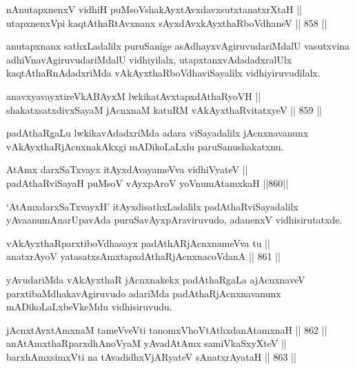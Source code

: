\begin{shl}
nAnutapxnenxV vidhiH puMsoV\s shakAyxtAvxdavxsutxtanatxrXtaH || \\
utapxnenxV\s pi kaqtAthaRtAvxnanx sAyxdAvxkAyxthaRboVdhaneV \hfill || 858 ||  
\end{shl}

\begin{artha}
anutapxnanx sathxLadalilx puruSanige asAdhayxvAgiruvudariMdalU vasutxvina adhiVnavAgiruvudariMdalU vidhiyilalx, utapxtanxvAdadadxralUlx kaqtAthaRnAdadxriMda vAkAyxthaRboVdhaviSayalilx vidhiyiruvudilalx.
\end{artha}

\begin{shl}
anavxyavayxtireVkABAyxM lwkikatAvxtapxdAthaRyoVH || \\
shakatxsatxdivxSayaM jAcnxnaM katuRM vAkAyxthaRvitatxyeV \hfill || 859 ||  
\end{shl}

\begin{artha}
padAthaRgaLu lwkikavAdadxriMda adara viSayadalilx jAcnxnavanunx vAkAyxthaRjAcnxnakAkxgi mADikoLaLxlu paruSanushakatxnu.
\end{artha}

\begin{shl}
AtAmx darxSaTxvayx itAyxdAvayameVva vidhiVyateV || \\
padAthaRviSayaH puMsoV vAyxpAroV yoV\s numAtamxkaH \hfill ||860||  
\end{shl}

\begin{artha}
`AtAmxdarxSaTxvayxH' itAyxdisathxLadalilx padAthaRviSayadalilx yAva\break anumAnarUpavAda puruSavAyxpAraviruvudo, adanenxV vidhisirutatxde.
\end{artha}

\begin{shl}
vAkAyxthaRparxtiboVdhasayx padAthARjAcnxnameVva tu || \\
anatxrAyoV yatasatxsAmxtapxdAthaRjAcnxnacoVdanA \hfill || 861 ||  
\end{shl}

\begin{artha}
yAvudariMda vAkAyxthaR jAcnxnakekx padAthaRgaLa ajAcnxnaveV parxtibaMdhakavAgiruvudo adariMda padAthaRjAcnxnavanunx mADikoLaLxbeVkeMdu vidhisiruvudu.
\end{artha}


\begin{shl}
jAcnxtAvx\s \s tAmxnaM tameVveVti tanomxVhoVtAthxdanAtamxnaH \hfill || 862 ||  \\
anAtAmxthaRparxdhAnoV\s yaM yAvadAtAmx samiVkaSxyXteV || \\
barxhAmxsimxVti na tAvadidhxVjARyateV sAnatxrAyataH \hfill || 863 ||  
\end{shl}

